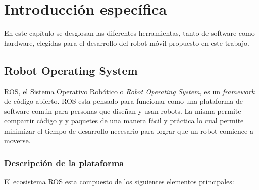 

\chapter{Introducción específica}

En este capítulo se desglosan las diferentes herramientas, tanto de software como hardware, elegidas para el desarrollo del robot móvil propuesto en este trabajo.

\label{Chapter2}

\section{Robot Operating System}

ROS, el Sistema Operativo Robótico o \textit{Robot Operating System}, es un \textit{framework} de código abierto. ROS esta pensado para funcionar como una plataforma de software común para personas que diseñan y usan robots. La misma permite compartir código y y paquetes de una manera fácil y práctica lo cual permite minimizar el tiempo de desarrollo necesario para lograr que un robot comience a moverse.

\subsection{Descripción de la plataforma}

El ecosistema ROS esta compuesto de los siguientes elementos principales:

